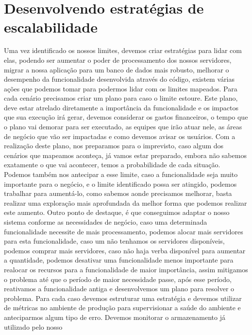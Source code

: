     \section{Desenvolvendo estratégias de escalabilidade}
      Uma vez identificado os nossos limites, devemos criar estratégias para lidar
      com elas, podendo ser aumentar o poder de processamento dos nossos servidores,
      migrar a nossa aplicação para um banco de dados mais robusto, melhorar o
      desempenho da funcionalidade desenvolvida através do código, existem
      várias ações que podemos tomar para podermos lidar com os limites mapeados.
      Para cada cenário precisamos criar um plano para caso o limite estoure. Este
      plano, deve estar atrelado diretamente a importância da funcionalidade e os
      impactos que sua execução irá gerar, devemos considerar os gastos financeiros,
      o tempo que o plano vai demorar para ser executado, as equipes que irão atuar
      nele, as áreas de negócio que vão ser impactadas e como devemos avisar os
      usuários. Com a realização deste plano, nos preparamos para o imprevisto,
      caso algum dos cenários que mapeamos aconteça, já vamos estar preparado,
      embora não sabemos exatamente o que vai acontecer, temos a probabilidade de
      cada situação. Podemos também nos antecipar a esse limite, caso a funcionalidade
      seja muito importante para o negócio, e o limite identificado possa ser atingido,
      podemos trabalhar para aumentá-lo, como sabemos aonde precisamos melhorar,
      basta realizar uma exploração mais aprofundada da melhor forma que podemos
      realizar este aumento. Outro ponto de destaque, é que conseguimos adaptar o
      nosso sistema conforme as necessidades de negócio, caso uma determinada
      funcionalidade necessite de mais processamento, podemos alocar mais servidores
      para esta funcionalidade, caso um não tenhamos os servidores disponíveis,
      podemos comprar mais servidores, caso não haja verba disponível para aumentar
      a quantidade, podemos desativar uma funcionalidade menos importante para
      realocar os recursos para a funcionalidade de maior importância, assim
      mitigamos o problema até que o período de maior necessidade passe, após esse
      período, reativamos a funcionalidade antiga e desenvolvemos um plano para
      resolver o problema. \newline
      Para cada caso devemos estruturar uma estratégia e devemos utilizar de métricas
      no ambiente de produção para supervisionar a saúde do ambiente e anteciparmos
      algum tipo de erro. Devemos monitorar o armazenamento já utilizado pelo nosso
